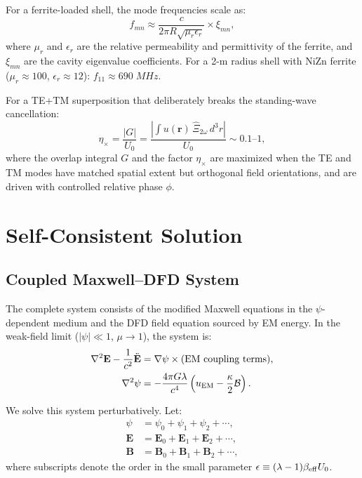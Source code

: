 \documentclass[twocolumn,prl,superscriptaddress,nofootinbib,longbibliography,floatfix]{revtex4-2}
\newcommand{\lam}{\lambda}
\newcommand{\kap}{\kappa}
\newcommand{\calB}{\mathcal{B}}
\begin{document}
For a ferrite-loaded shell, the mode frequencies scale as:
\begin{equation}
f_{mn} \approx \frac{c}{2\pi R\sqrt{\mu_r \epsilon_r}}
\times \xi_{mn},
\label{eq:mode-freq}
\end{equation}
where $\mu_r$ and $\epsilon_r$ are the relative permeability and
permittivity of the ferrite, and $\xi_{mn}$ are the cavity eigenvalue
coefficients.  For a 2-m radius shell with NiZn ferrite
($\mu_r \approx 100$, $\epsilon_r \approx 12$):
$f_{11} \approx 690\;\si{MHz}$.

For a TE+TM superposition that deliberately breaks the standing-wave
cancellation:
\begin{equation}
\eta_\times = \frac{|G|}{U_0}
= \frac{\left|\int u(\mathbf{r})\,\hat{\Xi}_{2\omega}\,d^3r\right|}
{U_0} \sim 0.1\text{--}1,
\label{eq:eta-cross}
\end{equation}
where the overlap integral $G$ and the factor $\eta_\times$ are
maximized when the TE and TM modes have matched spatial extent but
orthogonal field orientations, and are driven with controlled relative
phase $\phi$.

\section{Self-Consistent Solution}\label{sec:selfconsistent}

\subsection{Coupled Maxwell--DFD System}

The complete system consists of the modified Maxwell equations in the
$\psi$-dependent medium and the DFD field equation sourced by EM energy.
In the weak-field limit ($|\psi| \ll 1$, $\mu \to 1$), the system is:
\begin{align}
\nabla^2\mathbf{E} - \frac{1}{c^2}\ddot{\mathbf{E}} &=
\nabla\psi \times (\text{EM coupling terms}),
\label{eq:maxwell-coupled}\\
\nabla^2\psi &= -\frac{4\pi G\lam}{c^4}
\left(u_{\rm EM} - \frac{\kap}{2}\calB\right).
\label{eq:psi-coupled}
\end{align}

We solve this system perturbatively.  Let:
\begin{align}
\psi &= \psi_0 + \psi_1 + \psi_2 + \cdots, \\
\mathbf{E} &= \mathbf{E}_0 + \mathbf{E}_1 + \mathbf{E}_2 + \cdots, \\
\mathbf{B} &= \mathbf{B}_0 + \mathbf{B}_1 + \mathbf{B}_2 + \cdots,
\end{align}
where subscripts denote the order in the small parameter
$\epsilon \equiv (\lam - 1)\beta_{\rm eff} U_0$.
\end{document}
